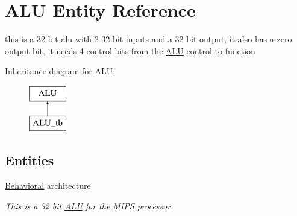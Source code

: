 \hypertarget{class_a_l_u}{\section{A\-L\-U Entity Reference}
\label{class_a_l_u}
}


this is a 32-\/bit alu with 2 32-\/bit inputs and a 32 bit output, it also has a zero output bit, it needs 4 control bits from the \hyperlink{class_a_l_u}{A\-L\-U} control to function  


Inheritance diagram for A\-L\-U\-:\begin{figure}[H]
\begin{center}
\leavevmode
\includegraphics[height=2.000000cm]{class_a_l_u}
\end{center}
\end{figure}
\subsection*{Entities}
\begin{DoxyCompactItemize}
\item 
\hyperlink{class_a_l_u_1_1_behavioral}{Behavioral} architecture
\begin{DoxyCompactList}\small\item\em This is a 32 bit \hyperlink{class_a_l_u}{A\-L\-U} for the M\-I\-P\-S processor. \end{DoxyCompactList}\end{DoxyCompactItemize}

